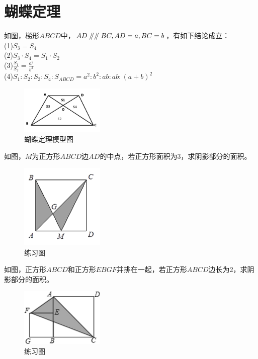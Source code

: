 \documentclass{ecnuthesis}
\newcommand\px{\mathrel{/\mkern-5mu/}}  %
\begin{document}
\section{蝴蝶定理}
\begin{model}
    如图，梯形$ABCD$中，$AD\px\px BC,AD=a,BC=b$，有如下结论成立：\\
    (1)$S_3=S_4$ \\
    (2)$S_3·S_4=S_1·S_2$ \\
    (3)$\frac{S_1}{S_2}=\frac{a^2}{b^2}$ \\
    (4)$S_1:S_2:S_3:S_4:S_{ABCD}=a^2:b^2:ab:ab:(a+b)^2$
\end{model}
\begin{figure}[H]
\centering
\includegraphics[width=4cm]{picture/690.png}
\caption{蝴蝶定理模型图}
\end{figure}
\begin{problem}
    如图，$M$为正方形$ABCD$边$AD$的中点，若正方形面积为3，求阴影部分的面积。
\end{problem}
\begin{figure}[H]
\centering
\includegraphics[width=4cm]{picture/691.png}
\caption{练习图}
\end{figure}
\begin{problem}
    如图，正方形$ABCD$和正方形$EBGF$并排在一起，若正方形$ABCD$边长为2，求阴影部分的面积。
\end{problem}
\begin{figure}[H]
\centering
\includegraphics[width=4cm]{picture/692.png}
\caption{练习图}
\end{figure}
\clearpage
\end{document}

